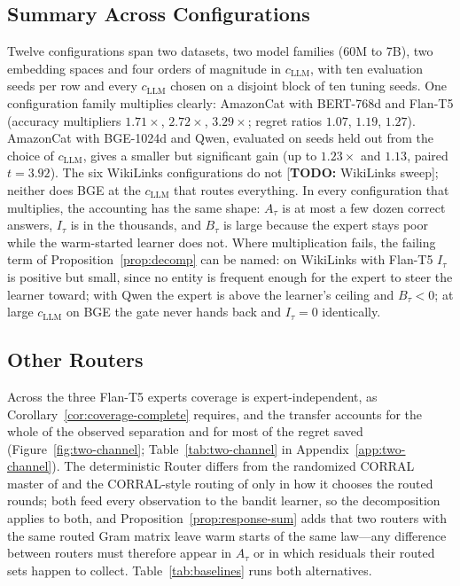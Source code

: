 \documentclass[anon]{alt2027} %
\newcommand{\todo}[1]{\textcolor{red!70!black}{[\textbf{TODO:} #1]}}
\begin{document}
\subsection{Summary Across Configurations}
\label{app:summary}

Twelve configurations span two datasets, two model families (60M to 7B), two
embedding spaces and four orders of magnitude in $c_{\mathrm{LLM}}$, with ten evaluation
seeds per row and every $c_{\mathrm{LLM}}$ chosen on a disjoint block of ten tuning seeds. One configuration family
multiplies clearly: AmazonCat with BERT-768d and Flan-T5 (accuracy multipliers
$1.71\times$, $2.72\times$, $3.29\times$; regret ratios $1.07$, $1.19$,
$1.27$). AmazonCat with BGE-1024d and Qwen, evaluated on seeds held out from
the choice of $c_{\mathrm{LLM}}$, gives a smaller but significant gain (up to $1.23\times$ and
$1.13$, paired $t=3.92$). The six WikiLinks configurations do not \todo{WikiLinks sweep};
neither does BGE at the $c_{\mathrm{LLM}}$ that routes everything. In every configuration
that multiplies, the accounting has the same shape: $A_\tau$ is at most a few
dozen correct answers, $I_\tau$ is in the thousands, and $B_\tau$ is large because the expert stays poor while the
warm-started learner does not. Where multiplication fails, the failing term of
Proposition~\ref{prop:decomp} can be named: on WikiLinks with Flan-T5
$I_\tau$ is positive but small, since no entity is frequent enough for the
expert to steer the learner toward; with Qwen the expert is above the learner's ceiling and $B_\tau<0$;
at large $c_{\mathrm{LLM}}$ on BGE the gate never hands back and $I_\tau=0$ identically.

\subsection{Other Routers}
\label{app:routers}

Across the three Flan-T5 experts coverage is
expert-independent, as Corollary~\ref{cor:coverage-complete} requires, and the
transfer accounts for the whole of the observed separation and for most of the
regret saved (Figure~\ref{fig:two-channel}; Table~\ref{tab:two-channel} in
Appendix~\ref{app:two-channel}). The deterministic Router differs from the
randomized CORRAL master of \citet{agarwal2017corralling} and the CORRAL-style
routing of \citet{chen2024llmdecision} only in how it chooses the routed
rounds; both feed every observation to the bandit learner, so the
decomposition applies to both, and Proposition~\ref{prop:response-sum} adds
that two routers with the same routed Gram matrix leave warm starts of the
same law---any difference between routers must therefore appear in $A_\tau$ or
in which residuals their routed sets happen to collect.
Table~\ref{tab:baselines} runs both alternatives.
\end{document}
